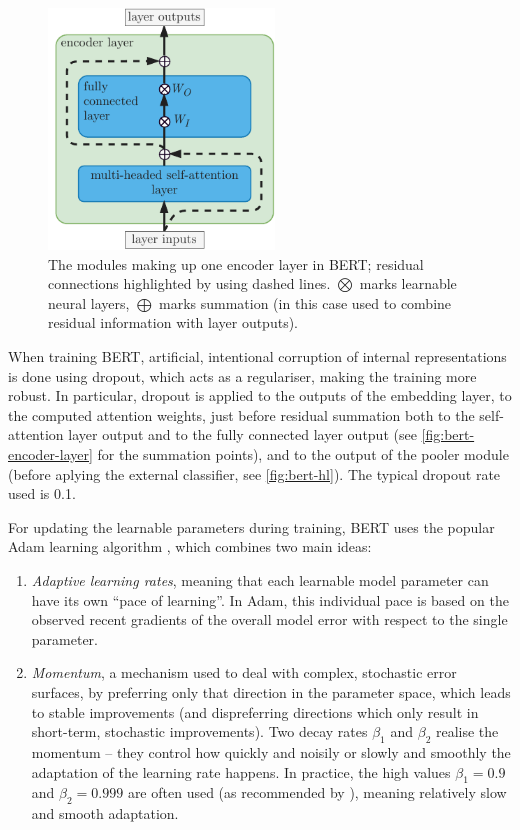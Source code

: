 \documentclass[bsc,frontabs,twoside,singlespacing,parskip,deptreport]{infthesis}
\begin{document}
{{{      \begin{figure}[h!t]
        \centering
        \includegraphics[width=6cm]{graphics/bert-encoder-layer}
        \caption{The modules making up one encoder layer in BERT; residual connections highlighted by using dashed lines. $\bigotimes$ marks learnable neural layers, $\bigoplus$ marks summation (in this case used to combine residual information with layer outputs).}
        \label{fig:bert-encoder-layer}
      \end{figure}

      When training BERT, artificial, intentional corruption of internal representations is done using dropout, which acts as a regulariser, making the training more robust. In particular, dropout is applied to the outputs of the embedding layer, to the computed attention weights, just before residual summation both to the self-attention layer output and to the fully connected layer output (see \autoref{fig:bert-encoder-layer} for the summation points), and to the output of the pooler module (before aplying the external classifier, see \autoref{fig:bert-hl}). The typical dropout rate used is 0.1.
      
      For updating the learnable parameters during training, BERT uses the popular Adam learning algorithm \citep{Kingma_2014}, which combines two main ideas:
      \begin{enumerate}
        \item \textit{Adaptive learning rates}, meaning that each learnable model parameter can have its own ``pace of learning''. In Adam, this individual pace is based on the observed recent gradients of the overall model error with respect to the single parameter.
        \item \textit{Momentum}, a mechanism used to deal with complex, stochastic error surfaces, by preferring only that direction in the parameter space, which leads to stable improvements (and dispreferring directions which only result in short-term, stochastic improvements). Two decay rates $\beta_1$ and $\beta_2$ realise the momentum -- they control how quickly and noisily or slowly and smoothly the adaptation of the learning rate happens. In practice, the high values $\beta_1=0.9$ and $\beta_2=0.999$ are often used (as recommended by \citeauthor{Kingma_2014}), meaning relatively slow and smooth adaptation.
      \end{enumerate}
      
}}}
\end{document}
